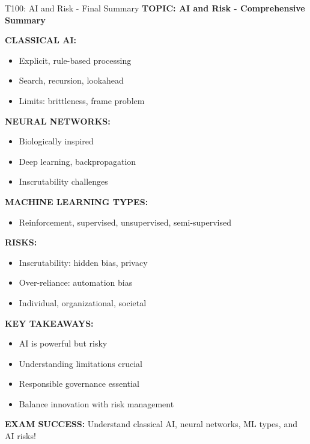 \documentclass[8pt]{beamer}
\begin{document}
	\begin{frame}{T100: AI and Risk - Final Summary}
		\fontsize{6.5}{7.5}\selectfont
		\textbf{TOPIC: AI and Risk - Comprehensive Summary}
		
		\vspace{0.1cm}
		\textbf{CLASSICAL AI:}
		\begin{itemize}
			\item Explicit, rule-based processing
			\item Search, recursion, lookahead
			\item Limits: brittleness, frame problem
		\end{itemize}
		
		\vspace{0.1cm}
		\textbf{NEURAL NETWORKS:}
		\begin{itemize}
			\item Biologically inspired
			\item Deep learning, backpropagation
			\item Inscrutability challenges
		\end{itemize}
		
		\vspace{0.1cm}
		\textbf{MACHINE LEARNING TYPES:}
		\begin{itemize}
			\item Reinforcement, supervised, unsupervised, semi-supervised
		\end{itemize}
		
		\vspace{0.1cm}
		\textbf{RISKS:}
		\begin{itemize}
			\item Inscrutability: hidden bias, privacy
			\item Over-reliance: automation bias
			\item Individual, organizational, societal
		\end{itemize}
		
		\vspace{0.1cm}
		\textbf{KEY TAKEAWAYS:}
		\begin{itemize}
			\item AI is powerful but risky
			\item Understanding limitations crucial
			\item Responsible governance essential
			\item Balance innovation with risk management
		\end{itemize}
		
		\textcolor{myred}{\textbf{EXAM SUCCESS:}} Understand \textcolor{myblue}{classical AI, neural networks, ML types, and AI risks}!
	\end{frame}
	
\end{document}
